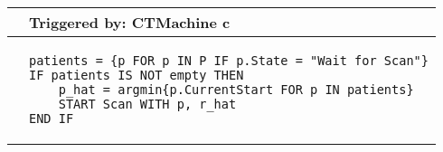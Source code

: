 \begin{tabular}{@{}>{\raggedright\arraybackslash}p{0.25cm}>{\raggedright\arraybackslash}p{13cm}@{}}
  \toprule
   & Triggered by: CTMachine c\\ \midrule 
  &
\vspace{-12pt}
\begin{lstlisting}[language=CMPseudo]
patients = {p FOR p IN P IF p.State = "Wait for Scan"}
IF patients IS NOT empty THEN 
    p_hat = argmin{p.CurrentStart FOR p IN patients}
    START Scan WITH p, r_hat
END IF
  \end{lstlisting}
  \\[-12pt] \bottomrule
  \end{tabular}